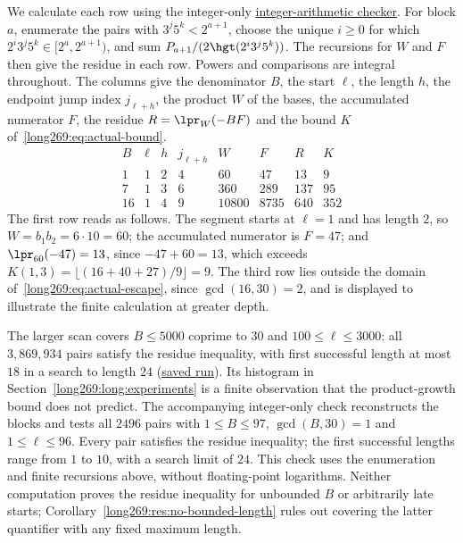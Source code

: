 We calculate each row using the integer-only
\href{\sourceurl/scripts/check_erdos269_dyadic_windows.py}{integer-arithmetic checker}.
For block $a$, enumerate the pairs with $3^j5^k<2^{a+1}$, choose the unique
$i\ge0$ for which $2^i3^j5^k\in[2^a,2^{a+1})$, and sum
$P_{a+1}/(2\hgt(2^i3^j5^k))$. The recursions for $W$ and $F$ then give
the residue in each row. Powers and comparisons are integral throughout.
The columns give the denominator $B$, the start
$\ell$, the length $h$, the endpoint jump index $j_{\ell+h}$, the product
$W$ of the bases, the accumulated numerator $F$, the residue
$R=\lpr_W(-BF)$ and the bound $K$ of~\eqref{long269:eq:actual-bound}.
\[
\begin{array}{c|c|c|c|r|r|r|r}
B&\ell&h&j_{\ell+h}&W&F&R&K\\ \hline
1&1&2&4&60&47&13&9\\
7&1&3&6&360&289&137&95\\
16&1&4&9&10800&8735&640&352
\end{array}
\]
The first row reads as follows.  The segment starts at $\ell=1$ and has length
$2$, so $W=b_1b_2=6\cdot10=60$; the accumulated numerator is $F=47$; and
$\lpr_{60}(-47)=13$, since $-47+60=13$, which exceeds
$K(1,3)=\lfloor(16+40+27)/9\rfloor=9$.  The third row lies outside the domain
of~\eqref{long269:eq:actual-escape}, since $\gcd(16,30)=2$, and is displayed to
illustrate the finite calculation at greater depth.

The larger scan covers $B\le5000$ coprime to $30$ and
$100\le\ell\le3000$: all $3{,}869{,}934$ pairs satisfy the residue inequality, with first successful length
at most $18$ in a search to length $24$
(\href{https://github.com/wcook04/plectis-erdos/blob/f757115e03bebe5c04431a147da559015c680a37/research/experiments/erdos269/large-computations/receipts/scan-5000-100-3000.json}{saved run}).
Its histogram in Section~\ref{long269:long:experiments} is a finite
observation that the product-growth bound does not predict.
The accompanying integer-only check reconstructs the blocks
and tests all $2496$ pairs with $1\le B\le97$, $\gcd(B,30)=1$ and
$1\le\ell\le96$.  Every pair satisfies the residue inequality; the first successful lengths range
from $1$ to $10$, with a search limit of $24$.  This check uses the
enumeration and finite recursions above, without floating-point
logarithms.  Neither computation proves the residue inequality for unbounded $B$ or
arbitrarily late starts; Corollary~\ref{long269:res:no-bounded-length}
rules out covering the latter quantifier with any fixed maximum length.

